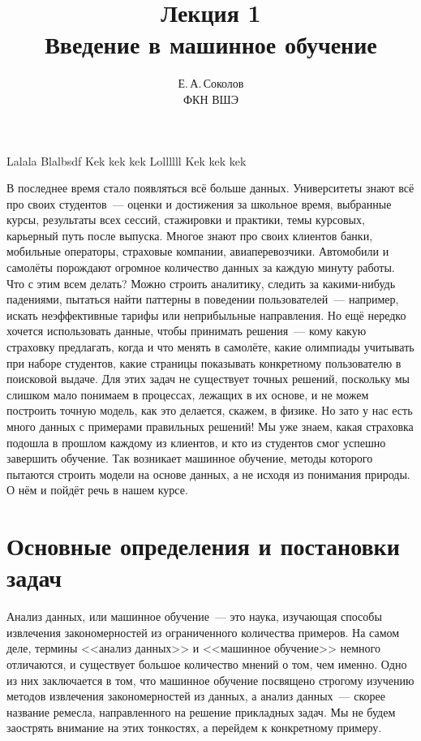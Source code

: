 \documentclass[12pt,fleqn]{article}
\begin{document}
\title{Лекция 1\\Введение в машинное обучение}
\author{Е.\,А.\,Соколов\\ФКН ВШЭ}
\maketitle

Lalala
Blalbsdf
Kek kek kek
Lollllll
Kek kek kek

В последнее время стало появляться всё больше данных.
Университеты знают всё про своих студентов~--- оценки и достижения за школьное время,
выбранные курсы, результаты всех сессий, стажировки и практики, темы курсовых,
карьерный путь после выпуска.
Многое знают про своих клиентов банки, мобильные операторы, страховые компании, авиаперевозчики.
Автомобили и самолёты порождают огромное количество данных за каждую минуту работы.
Что с этим всем делать?
Можно строить аналитику, следить за какими-нибудь падениями, пытаться найти паттерны в поведении
пользователей~--- например, искать неэффективные тарифы или неприбыльные направления.
Но ещё нередко хочется использовать данные, чтобы принимать решения~--- кому какую страховку предлагать,
когда и что менять в самолёте, какие олимпиады учитывать при наборе студентов,
какие страницы показывать конкретному пользователю в поисковой выдаче.
Для этих задач не существует точных решений, поскольку мы слишком мало понимаем в процессах,
лежащих в их основе, и не можем построить точную модель, как это делается, скажем, в физике.
Но зато у нас есть много данных с примерами правильных решений!
Мы уже знаем, какая страховка подошла в прошлом каждому из клиентов,
и кто из студентов смог успешно завершить обучение.
Так возникает машинное обучение, методы которого пытаются строить модели
на основе данных, а не исходя из понимания природы.
О нём и пойдёт речь в нашем курсе.

\section{Основные определения и постановки задач}
Анализ данных, или машинное обучение~--- это наука, изучающая способы извлечения закономерностей
из ограниченного количества примеров.
На самом деле, термины <<анализ данных>> и <<машинное обучение>> немного отличаются, и существует большое
количество мнений о том, чем именно.
Одно из них заключается в том, что машинное обучение посвящено строгому
изучению методов извлечения закономерностей из данных,
а анализ данных~--- скорее название ремесла, направленного на решение прикладных задач.
Мы не будем заострять внимание на этих тонкостях, а перейдем к конкретному примеру.
\end{document}
